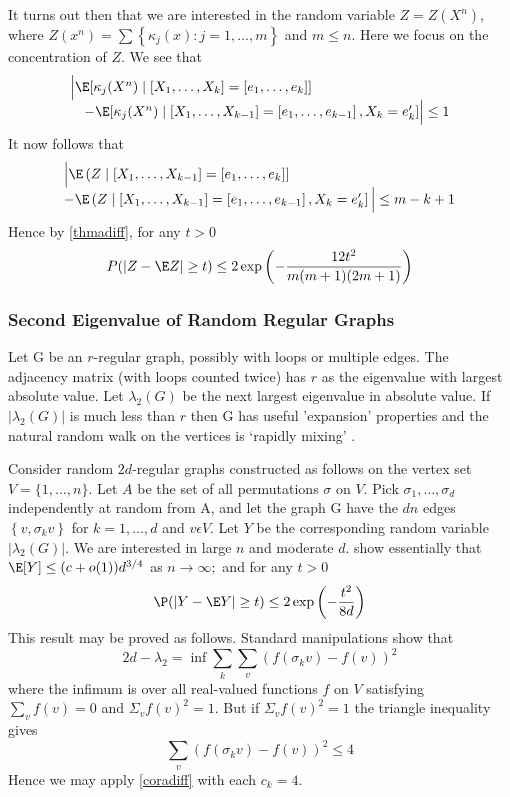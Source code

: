\documentclass{article}
\begin{document}
It turns out then that we are interested in the random variable $Z = Z (X^n)$, where $Z (x^n)=\sum\left\{\kappa_{ j }( x ): j =1, \ldots, m \right\}$ and $m \leq n$. Here we focus on the
concentration of $Z$. We see that
$$
\begin{array}{l}
\Big| \E[\kappa_{ j }(X^n) \mid\left[ X _{1}, \ldots, X _{ k }\right]=\left[ e _{1}, \ldots, e _{ k }\right]] \\
\quad- \E[\kappa_{ j }(X^n) \mid\left[ X _{1}, \ldots, X _{ k -1}\right]=\left[ e _{1}, \ldots, e _{ k -1}\right], X _{ k }= e _{ k }^{\prime}] \Big|\leq 1
\end{array}
$$
It now follows that
$$
\begin{array}{l}
\Big| \E \left( Z \mid\left[ X _{1}, \ldots, X _{ k -1}\right]=\left[ e _{1}, \ldots, e _{ k }\right]\right] \\
- \E \left( Z \mid\left[ X _{1}, \ldots, X _{ k -1}\right]=\left[ e _{1}, \ldots, e _{ k -1}\right], X _{ k }=e_{ k }^{\prime}\right] \Big| \leq m - k +1
\end{array}
$$
Hence by \cref{thmadiff}, for any $t>0$
$$
P (| Z - \E Z | \geq t) \leq 2 \exp \left(-\frac{12 t ^{2} }{ m ( m +1)(2 m +1)}\right)
$$

\subsubsection{ Second Eigenvalue of Random Regular Graphs}
Let G be an $r$-regular graph, possibly with loops or multiple edges.
The adjacency matrix (with loops counted twice) has $r$ as the eigenvalue with  largest absolute value. Let $\lambda_{2}(G)$ be the next largest eigenvalue in absolute value.
If $\left|\lambda_{2}(G)\right|$ is much less than $r$ then G has useful 'expansion' properties and the natural random walk on the vertices is `rapidly mixing' \cite{friedman1989second}.

Consider random $2d$-regular graphs constructed as follows on the
vertex set $V =\{1, \ldots, n \} .$ Let $A$ be the set of all permutations $\sigma$ on $V$. Pick
$\sigma_{1}, \ldots, \sigma_{ d }$ independently at random from A, and let the graph G have the $dn$ edges $\left\{v, \sigma_{k} v\right\}$ for $k=1, \ldots, d$ and $v \epsilon V$. Let $Y$ be the corresponding random variable $\left|\lambda_{2}(G)\right| .$ We are interested in large $n$ and moderate $d$. \cite{friedman1989second} show essentially that $\E [ Y ] \leq( c + o (1)) d ^{3 / 4}$ as $n \to \infty ;$ and for any $t >0$
$$
\P (| Y - \E Y | \geq t) \leq 2 \exp \left(-\frac{ t ^{2} }{ 8 d} \right)
$$
This result may be proved as follows. Standard
manipulations show that
$$
2 d -\lambda_{2}=\inf \sum_{ k } \sum_{ v }\left(f(\sigma_{ k } v)- f ( v )\right)^{2}
$$
where the infimum is over all real-valued functions $f$ on $V$ satisfying $\sum _{ v } f ( v )=0$ and $\Sigma_{v} f(v)^{2}=1 .$ But if $\Sigma_{v} f(v)^{2}=1$ the triangle inequality gives
$$
\sum_{ v }\left( f (\sigma_{ k } v)- f ( v )\right)^{2} \leq 4
$$
Hence we may apply \cref{coradiff} with each $c_{ k }=4$.
\end{document}
